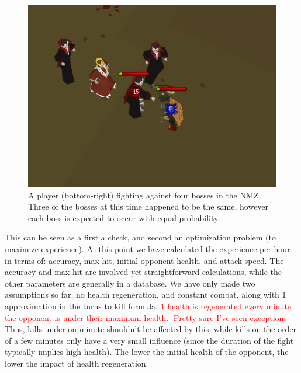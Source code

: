 \documentclass[../../main.tex]{subfiles}
\begin{document}
		\begin{figure}
			\includegraphics[width=\linewidth]{img/NMZ.png}
			\caption{A player (bottom-right) fighting against four bosses in the NMZ. Three of the bosses at this time happened to be the same, however each boss is expected to occur with equal probability.}
			\label{fig:nmz}
		\end{figure}

		This can be seen as a first a check, and second an optimization problem (to maximize experience). At this point we have calculated the experience per hour in terms of: accuracy, max hit, initial opponent health, and attack speed. The accuracy and max hit are involved yet straightforward calculations, while the other parameters are generally in a database. We have only made two assumptions so far, no health regeneration, and constant combat, along with 1 approximation in the turns to kill formula. \textcolor{red}{1 health is regenerated every minute the opponent is under their maximum health. [Pretty sure I've seen exceptions]} Thus, kills under on minute shouldn't be affected by this, while kills on the order of a few minutes only have a very small influence (since the duration of the fight typically implies high health). The lower the initial health of the opponent, the lower the impact of health regeneration.
\end{document}
